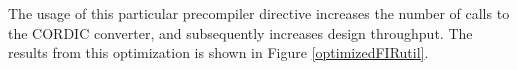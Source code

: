 \documentclass[../report_polarFIR.tex]{subfiles}
\begin{document}
		\begin{singlespace}
            
        \end{singlespace}
        
        The usage of this particular precompiler directive increases the number of calls to the CORDIC converter, and subsequently increases design throughput. The results from this optimization is shown in Figure \ref{optimizedFIRutil}.
\end{document}
